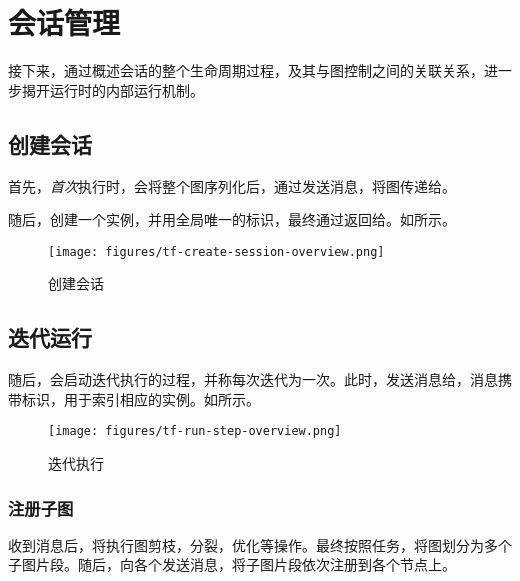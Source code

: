 \section{会话管理}
	
\begin{content}

接下来，通过概述会话的整个生命周期过程，及其与图控制之间的关联关系，进一步揭开运行时的内部运行机制。

\subsection{创建会话}

首先，\emph{首次}执行时，会将整个图序列化后，通过发送消息，将图传递给。

随后，创建一个实例，并用全局唯一的标识，最终通过返回给。如所示。

\begin{figure}[!h]
\centering
\texttt{[image: figures/tf-create-session-overview.png]}
\caption{创建会话}
 \label{fig:tf-create-session-overview}
\end{figure}

\subsection{迭代运行}

随后，会启动迭代执行的过程，并称每次迭代为一次。此时，发送消息给，消息携带标识，用于索引相应的实例。如所示。

\begin{figure}[!h]
\centering
\texttt{[image: figures/tf-run-step-overview.png]}
\caption{迭代执行}
 \label{fig:tf-run-step-overview}
\end{figure}

\subsubsection{注册子图}

收到消息后，将执行图剪枝，分裂，优化等操作。最终按照任务，将图划分为多个子图片段。随后，向各个发送消息，将子图片段依次注册到各个节点上。


\end{content}
